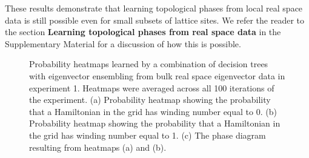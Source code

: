 \documentclass[fleqn,10pt]{wlscirep}
\begin{document}
These results demonstrate that learning topological phases from local real space data is still possible even for small subsets of lattice sites. We refer the reader to the section \textbf{Learning topological phases from real space data} in the Supplementary Material for a discussion of how this is possible.

\begin{figure}
\centering
{}
\caption{Probability heatmaps learned by a combination of decision trees with eigenvector ensembling from bulk real space eigenvector data in experiment 1. Heatmaps were averaged across all 100 iterations of the experiment. (a) Probability heatmap showing the probability that a Hamiltonian in the grid has winding number equal to 0.  (b) Probability heatmap showing the probability that a Hamiltonian in the grid has winding number equal to 1. (c) The phase diagram resulting from heatmaps (a) and (b).}
\label{ssh1_heatmaps}
\end{figure}
\end{document}
